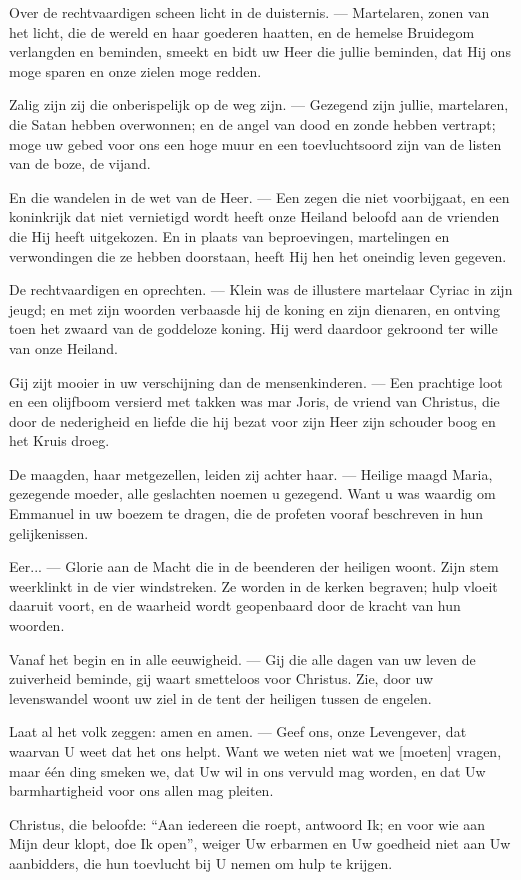 \documentclass[12pt,twoside,a5paper]{article}
\newlength{\origparskip}
\newenvironment{halfparskip}{
  \setlength{\parskip}{0.5\origparskip}
}{
  \setlength{\parskip}{\origparskip}
}
\begin{document}
\begin{halfparskip}
  Over de rechtvaardigen scheen licht in de duisternis. --- Martelaren, zonen van het licht, die de wereld en haar goederen haatten, en de hemelse Bruidegom verlangden en beminden, smeekt en bidt uw Heer die jullie beminden, dat Hij ons moge sparen en onze zielen moge redden.

  Zalig zijn zij die onberispelijk op de weg zijn. --- Gezegend zijn jullie, martelaren, die Satan hebben overwonnen; en de angel van dood en zonde hebben vertrapt; moge uw gebed voor ons een hoge muur en een toevluchtsoord zijn van de listen van de boze, de vijand.

  En die wandelen in de wet van de Heer. --- Een zegen die niet voorbijgaat, en een koninkrijk dat niet vernietigd  wordt heeft onze Heiland beloofd aan de vrienden die Hij heeft uitgekozen. En in plaats van beproevingen, martelingen en verwondingen die ze hebben doorstaan, heeft Hij hen het oneindig leven gegeven.

  De rechtvaardigen en oprechten. --- Klein was de illustere martelaar Cyriac in zijn jeugd; en met zijn woorden verbaasde hij de koning en zijn dienaren, en ontving toen het zwaard van de goddeloze koning. Hij werd daardoor gekroond ter wille van onze Heiland.

  Gij zijt mooier in uw verschijning dan de mensenkinderen. --- Een prachtige loot en een olijfboom versierd met takken was mar Joris, de vriend van Christus, die door de nederigheid en liefde die hij bezat voor zijn Heer zijn schouder boog en het Kruis droeg.

  De maagden, haar metgezellen, leiden zij achter haar. --- Heilige maagd Maria, gezegende moeder, alle geslachten noemen u gezegend. Want u was waardig om Emmanuel in uw boezem te dragen, die de profeten vooraf beschreven in hun gelijkenissen.

  Eer... --- Glorie aan de Macht die in de beenderen der heiligen woont. Zijn stem weerklinkt in de vier windstreken. Ze worden in de kerken begraven; hulp vloeit daaruit voort, en de waarheid wordt geopenbaard door de kracht van hun woorden.

  Vanaf het begin en in alle eeuwigheid. --- Gij die alle dagen van uw leven de zuiverheid beminde, gij waart smetteloos voor Christus. Zie, door uw levenswandel woont uw ziel in de tent der heiligen tussen de engelen.

  Laat al het volk zeggen: amen en amen. --- Geef ons, onze Levengever, dat waarvan U weet dat het ons helpt. Want we weten niet wat we [moeten] vragen, maar één ding smeken we, dat Uw wil in ons vervuld mag worden, en dat Uw barmhartigheid voor ons allen mag pleiten.

  Christus, die beloofde: ``Aan iedereen die roept, antwoord Ik; en voor wie aan Mijn deur klopt, doe Ik open'', weiger Uw erbarmen en Uw goedheid niet aan Uw aanbidders, die hun toevlucht bij U nemen om hulp te krijgen.
\end{halfparskip}
\end{document}
